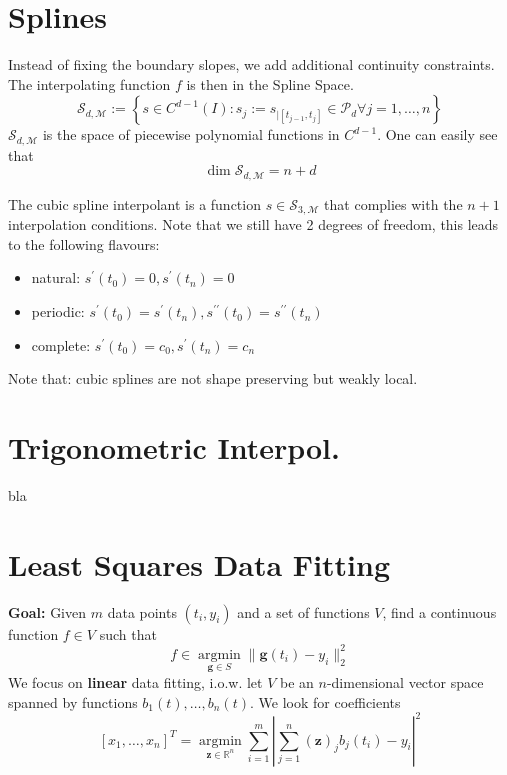\section{Splines}
Instead of fixing the boundary slopes, we add additional continuity constraints. The interpolating function $f$ is then in the Spline Space.\\

$${\scriptstyle
\mathcal{S}_{d, \mathcal{M}}:=\left\{s \in C^{d-1}(I): s_{j}:=s_{\mid\left[t_{j-1}, t_{j}\right]} \in \mathcal{P}_{d} \forall j=1, \ldots, n\right\}}
$$
$\mathcal{S}_{d, \mathcal{M}}$ is the space of piecewise polynomial functions in $C^{d-1}$. One can easily see that $$
\operatorname{dim} \mathcal{S}_{d, \mathcal{M}}=n+d
$$

 The cubic spline interpolant is a function $s \in \mathcal{S}_{3, \mathcal{M}}$ that complies with the $n+1$ interpolation conditions. Note that we still have 2 degrees of freedom, this leads to the following flavours:
\begin{itemize}
	\item natural: $s^{\prime}\left(t_{0}\right)=0, s^{\prime}\left(t_{n}\right)=0$
	\item periodic: $s^{\prime}\left(t_{0}\right)=s^{\prime}\left(t_{n}\right), s^{\prime\prime}\left(t_{0}\right)=s^{\prime\prime}\left(t_{n}\right)$
	\item complete: $s^{\prime}\left(t_{0}\right)=c_{0}, s^{\prime}\left(t_{n}\right)=c_{n}$
\end{itemize}

Note that: cubic splines are not shape preserving but weakly local.

\section{Trigonometric Interpol.}
bla

\section{Least Squares Data Fitting}
\textbf{Goal:} Given $m$ data points $(t_i, y_i)$ and a set of functions $V$, find a continuous function $f\in V$ such that
$$
f \in \underset{\mathbf{g} \in S}{\operatorname{argmin}}\|\textbf{g}(t_i)-y_i\|_{2}^{2}
$$
We focus on \textbf{linear} data fitting, i.o.w. let $V$ be an $n$-dimensional vector space spanned by functions $b_1(t), \dots, b_n(t)$. We look for coefficients 
$$[x_1,\dots,x_n]^T=\underset{\mathbf{z} \in \mathbb{R}^{n}}{\operatorname{argmin}} \sum_{i=1}^{m}\left|\sum_{j=1}^{n}(\mathbf{z})_{j} b_{j}\left(t_{i}\right)-y_{i}\right|^{2}$$


